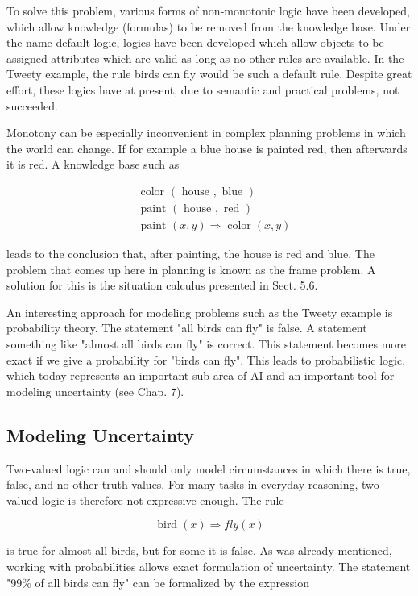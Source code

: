 \documentclass[10pt]{book}
\begin{document}
To solve this problem, various forms of non-monotonic logic have been developed, which allow knowledge (formulas) to be removed from the knowledge base. Under the name default logic, logics have been developed which allow objects to be assigned attributes which are valid as long as no other rules are available. In the Tweety example, the rule birds can fly would be such a default rule. Despite great effort, these logics have at present, due to semantic and practical problems, not succeeded.

Monotony can be especially inconvenient in complex planning problems in which the world can change. If for example a blue house is painted red, then afterwards it is red. A knowledge base such as

$$
\begin{aligned}
& \text { color }(\text { house }, \text { blue }) \\
& \text { paint }(\text { house }, \text { red }) \\
& \text { paint }(x, y) \Rightarrow \operatorname{color}(x, y)
\end{aligned}
$$

leads to the conclusion that, after painting, the house is red and blue. The problem that comes up here in planning is known as the frame problem. A solution for this is the situation calculus presented in Sect. 5.6.

An interesting approach for modeling problems such as the Tweety example is probability theory. The statement "all birds can fly" is false. A statement something like "almost all birds can fly" is correct. This statement becomes more exact if we give a probability for "birds can fly". This leads to probabilistic logic, which today represents an important sub-area of AI and an important tool for modeling uncertainty (see Chap. 7).

\subsection*{Modeling Uncertainty}
Two-valued logic can and should only model circumstances in which there is true, false, and no other truth values. For many tasks in everyday reasoning, two-valued logic is therefore not expressive enough. The rule

$$
\operatorname{bird}(x) \Rightarrow f l y(x)
$$

is true for almost all birds, but for some it is false. As was already mentioned, working with probabilities allows exact formulation of uncertainty. The statement "99\% of all birds can fly" can be formalized by the expression
\end{document}
